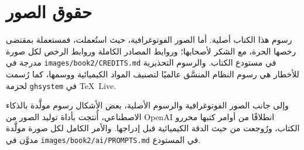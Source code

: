 \chapter*{حقوق الصور}

رسوم هذا الكتاب أصلية. أما الصور الفوتوغرافية، حيث استُعملت، فمستعملة
بمقتضى رخصها الحرة، مع الشكر لأصحابها؛ وروابط المصادر الكاملة وروابط
الرخص لكل صورة مدرجة في
\texttt{images/book2/CREDITS.md} في مستودع الكتاب.
والرسوم التحذيرية للأخطار هي رسوم النظام المنسَّق عالميًا لتصنيف
المواد الكيميائية ووسمها، كما رُسمت لحزمة
\texttt{ghsystem} في \TeX\ Live.

\bigskip
وإلى جانب الصور الفوتوغرافية والرسوم الأصلية، بعض الأشكال
رسوم مولَّدة بالذكاء الاصطناعي، أُنتجت بأداة توليد الصور من OpenAI انطلاقًا من
أوامر كتبها محررو الكتاب، ورُوجعت من حيث الدقة الكيميائية قبل
إدراجها. والأمر الكامل لكل صورة مولَّدة
مدوَّن في \texttt{images/book2/ai/PROMPTS.md} في المستودع.

